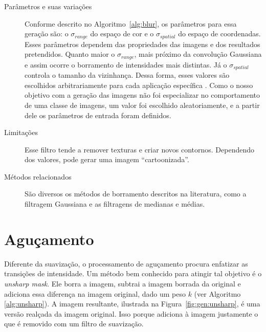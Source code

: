 \FloatBarrier
\begin{description}
  \item[Parâmetros e suas variações] Conforme descrito no Algoritmo~\ref{alg:blur}, os parâmetros para essa geração são: o $\sigma_{range}$ do espaço de cor e o $\sigma_{spatial}$ do espaço de coordenadas. Esses parâmetros dependem das propriedades das imagens e dos resultados pretendidos. Quanto maior o $\sigma_{range}$, mais próximo da convolução Gaussiana e assim ocorre o borramento de intensidades mais distintas. Já o $\sigma_{spatial}$ controla o tamanho da vizinhança. Dessa forma, esses valores são escolhidos arbitrariamente para cada aplicação específica \cite{Tomasi1998}. Como o nosso objetivo com a geração das imagens não foi especializar no comportamento de uma classe de imagens, um valor foi escolhido aleatoriamente, e a partir dele os parâmetros de entrada foram definidos.

  \item[Limitações] Esse filtro tende a remover texturas e criar novos contornos. Dependendo dos valores, pode gerar uma imagem ``cartoonizada''.

  \item[Métodos relacionados] São diversos os métodos de borramento descritos na literatura, como a filtragem Gaussiana e as filtragens de medianas e médias.


\end{description}
\section{Aguçamento}

Diferente da suavização, o processamento de aguçamento procura enfatizar as transições de intensidade. Um método bem conhecido para atingir tal objetivo é o \textit{unsharp mask}. Ele borra a imagem, subtrai a imagem borrada da original e adiciona essa diferença na imagem original, dado um peso $k$ (ver Algoritmo \ref{alg:unsharp}). A imagem resultante, ilustrada na Figura~\ref{fig:gen:unsharp}, é uma versão realçada da imagem original. Isso porque adiciona à imagem justamente o que é removido com um filtro de suavização.

